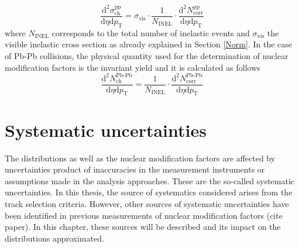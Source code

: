 \documentclass[12pt,a4paper]{report}
\begin{document}
\begin{equation}
\label{EqdiffCross}
\dfrac{\text{d}^2 \sigma^\text{pp}_\text{ch} }{\text{d}\eta \text{d}p_\text{T}} = \sigma_\text{vis} \cdot \dfrac{1}{N_\text{INEL}} \cdot \dfrac{\text{d}^2 N^\text{pp}	_\text{corr}}{\text{d}\eta \text{d}p_\text{T}}
\end{equation}
where $N_\text{INEL}$ corresponds to the total number of inelastic events and $\sigma_\text{vis}$ the visible inelastic cross section as already explained in Section \ref{Norm}. 
In the case of Pb-Pb collisions, the physical quantity used for the determination of nuclear modification factors is the invariant yield and it is calculated as follows
\begin{equation}
\label{Eqinyield}
\dfrac{\text{d}^2 N^\text{Pb-Pb}_\text{ch}}{\text{d}\eta \text{d}p_\text{T}} = \dfrac{1}{N_\text{INEL}} \cdot \dfrac{\text{d}^2 N^\text{Pb-Pb}_\text{corr}}{\text{d}\eta \text{d}p_\text{T}}
\end{equation}
\section{Systematic uncertainties}
The \pt distributions as well as the nuclear modification factors are affected by uncertainties product of inaccuracies in the measurement instruments or assumptions made in the analysis approaches. These are the so-called systematic uncertainties. In this thesis, the source of systematics considered arises from the track selection criteria. However, other sources of systematic uncertainties have been identified in previous measurements of nuclear modification factors (cite paper). In this chapter, these sources will be described and its impact on the \pt distributions approximated.
\end{document}
